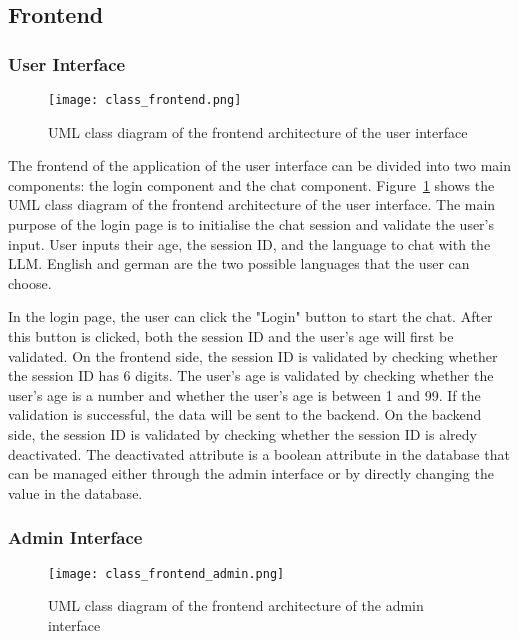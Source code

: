 \subsection{Frontend}

\subsubsection{User Interface}

\begin{figure}[h!]
    \centering
    \texttt{[image: class\_frontend.png]}
    \caption{UML class diagram of the frontend architecture of the user interface}
    \label{class_frontend}
\end{figure}

The frontend of the application of the user interface can be divided into two main components: the login component and the chat component.
Figure~\ref{class_frontend} shows the UML class diagram of the frontend architecture of the user interface.
The main purpose of the login page is to initialise the chat session and validate the user's input.
User inputs their age, the session ID, and the language to chat with the \ac{LLM}.
English and german are the two possible languages that the user can choose.

In the login page, the user can click the "Login" button to start the chat.
After this button is clicked, both the session ID and the user's age will first be validated.
On the frontend side, the session ID is validated by checking whether the session ID has 6 digits.
The user's age is validated by checking whether the user's age is a number and whether the user's age is between 1 and 99.
If the validation is successful, the data will be sent to the backend.
On the backend side, the session ID is validated by checking whether the session ID is alredy deactivated.
The deactivated attribute is a boolean attribute in the database that can be managed either through the admin interface or by directly changing the value in the database.

\subsubsection{Admin Interface}

\begin{figure}[h!]
    \centering
    \texttt{[image: class\_frontend\_admin.png]}
    \caption{UML class diagram of the frontend architecture of the admin interface}
    \label{class_frontend_admin}
\end{figure}

